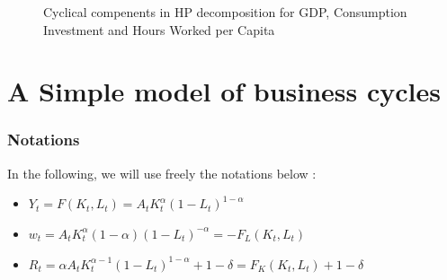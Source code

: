 \documentclass[12pt]{article}
\begin{document}
\begin{figure}[h]
    \centering
    \hspace{-20pt}
    \caption{Cyclical compenents in HP decomposition for GDP, Consumption Investment and Hours Worked per Capita}
    \label{fig:cycles}
\end{figure}
\newpage
\section{A Simple model of business cycles}
\subsubsection*{Notations}
In the following, we will use freely the notations below :
\begin{itemize}
    \item $Y_t = F(K_t, L_t) = A_t K_t^{\alpha}(1 - L_t)^{1 - \alpha}$
    \item $w_t = A_t K_t^{\alpha} (1 - \alpha)(1 - L_t)^{-\alpha} = - F_L(K_t,L_t)$
    \item $R_t = \alpha A_t K_t^{\alpha -1 } (1 - L_t)^{1 - \alpha} + 1 - \delta = F_K(K_t, L_t) + 1 - \delta$
\end{itemize}
\end{document}
